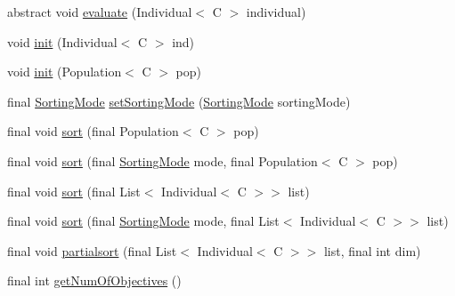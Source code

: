 \begin{CompactItemize}
\item 
abstract void \hyperlink{classjenes_1_1population_1_1_fitness_3_01_c_01extends_01_chromosome_01_4_1e93c0c2af37eb586fe77ad1dc8df761}{evaluate} (Individual$<$ C $>$ individual)
\item 
void \hyperlink{classjenes_1_1population_1_1_fitness_3_01_c_01extends_01_chromosome_01_4_1b67ac3ad38e0d5ce0ba6a75708a5e2d}{init} (Individual$<$ C $>$ ind)
\item 
void \hyperlink{classjenes_1_1population_1_1_fitness_3_01_c_01extends_01_chromosome_01_4_fc31605de5bbaae2ca16718628c72847}{init} (Population$<$ C $>$ pop)
\item 
final \hyperlink{classjenes_1_1population_1_1_fitness_3_01_c_01extends_01_chromosome_01_4_c870345ce476556f78be491643dbb62d}{SortingMode} \hyperlink{classjenes_1_1population_1_1_fitness_3_01_c_01extends_01_chromosome_01_4_8741e8d5e0045bce51edbe0d58b32e0d}{setSortingMode} (\hyperlink{classjenes_1_1population_1_1_fitness_3_01_c_01extends_01_chromosome_01_4_c870345ce476556f78be491643dbb62d}{SortingMode} sortingMode)
\item 
final void \hyperlink{classjenes_1_1population_1_1_fitness_3_01_c_01extends_01_chromosome_01_4_99d06b2b20048c7279139381247678c0}{sort} (final Population$<$ C $>$ pop)
\item 
final void \hyperlink{classjenes_1_1population_1_1_fitness_3_01_c_01extends_01_chromosome_01_4_939407da23b7bfed0f12233a74690e46}{sort} (final \hyperlink{classjenes_1_1population_1_1_fitness_3_01_c_01extends_01_chromosome_01_4_c870345ce476556f78be491643dbb62d}{SortingMode} mode, final Population$<$ C $>$ pop)
\item 
final void \hyperlink{classjenes_1_1population_1_1_fitness_3_01_c_01extends_01_chromosome_01_4_966f1a594a9eed5607e27222fd27e696}{sort} (final List$<$ Individual$<$ C $>$$>$ list)
\item 
final void \hyperlink{classjenes_1_1population_1_1_fitness_3_01_c_01extends_01_chromosome_01_4_3b46414d970cf62539adcd5a3e065268}{sort} (final \hyperlink{classjenes_1_1population_1_1_fitness_3_01_c_01extends_01_chromosome_01_4_c870345ce476556f78be491643dbb62d}{SortingMode} mode, final List$<$ Individual$<$ C $>$$>$ list)
\item 
final void \hyperlink{classjenes_1_1population_1_1_fitness_3_01_c_01extends_01_chromosome_01_4_1f054be21d8801e9485f7ba08ff62db4}{partialsort} (final List$<$ Individual$<$ C $>$$>$ list, final int dim)
\item 
final int \hyperlink{classjenes_1_1population_1_1_fitness_3_01_c_01extends_01_chromosome_01_4_2c1cb27db38fde35b764b0bf88e7c7f3}{getNumOfObjectives} ()
$$
\end{CompactItemize}
